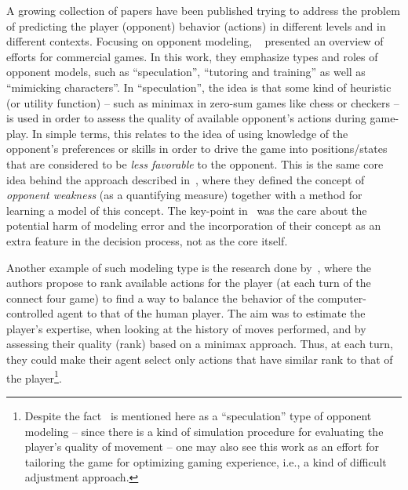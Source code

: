 A growing collection of papers have been published trying to address the problem of predicting the player (opponent) behavior (actions) in different levels and in different contexts. Focusing on opponent modeling, ~\cite{herik_opponent_2005} presented an overview of efforts for commercial games. In this work, they emphasize types and roles of opponent models, such as ``speculation'', ``tutoring and training'' as well as ``mimicking characters''. In ``speculation'', the idea is that some kind of heuristic (or utility function) -- such as minimax in zero-sum games like chess or checkers -- is used in order to assess the quality of available opponent's actions during game-play. In simple terms, this relates to the idea of using knowledge of the opponent's preferences or skills in order to drive the game into positions/states that are considered to be \textit{less favorable} to the opponent. This is the same core idea behind the approach described in~\cite{markovitch_learning_2005}, where they defined the concept of \textit{opponent weakness} (as a quantifying measure) together with a method for learning a model of this concept. The key-point in~\cite{markovitch_learning_2005} was the care about the potential harm of modeling error and the incorporation of their concept as an extra feature in the decision process, not as the core itself.

Another example of such modeling type is the research done by~\cite{missura_online_2008}, where the authors propose to rank available actions for the player (at each turn of the connect four game) to find a way to balance the behavior of the computer-controlled agent to that of the human player. The aim was to estimate the player's expertise, when looking at the history of moves performed, and by assessing their quality (rank) based on a minimax approach.  Thus, at each turn, they could make their agent select only actions that have similar rank to that of the player\footnote{Despite the fact~\cite{missura_online_2008} is mentioned here as a ``speculation'' type of opponent modeling -- since there is a kind of simulation procedure for evaluating the player's quality of movement -- one may also see this work as an effort for tailoring the game for optimizing gaming experience, i.e., a kind of difficult adjustment approach.}.

